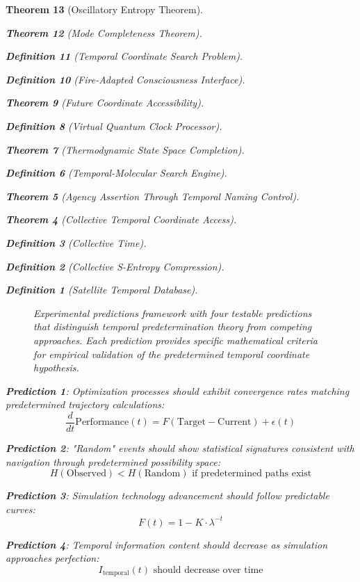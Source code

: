 \documentclass[12pt,a4paper]{article}
\newtheorem{theorem}{Theorem}[section]
\newtheorem{definition}[theorem]{Definition}
\begin{document}
\begin{theorem}[Oscillatory Entropy Theorem]
\begin{theorem}[Mode Completeness Theorem]
\begin{enumerate}
\begin{definition}[Temporal Coordinate Search Problem]
\begin{algorithm}
\begin{definition}[Fire-Adapted Consciousness Interface]
\begin{theorem}[Future Coordinate Accessibility]
\begin{definition}[Virtual Quantum Clock Processor]
\begin{itemize}
\begin{itemize}
\begin{theorem}[Thermodynamic State Space Completion]
\begin{definition}[Temporal-Molecular Search Engine]
\begin{theorem}[Agency Assertion Through Temporal Naming Control]
\begin{remark}
\begin{theorem}[Collective Temporal Coordinate Access]
\begin{definition}[Collective Time]
\begin{definition}[Collective S-Entropy Compression]
\begin{definition}[Satellite Temporal Database]
\begin{algorithm}
\begin{table}[h]
{{\begin{figure}[h]
\caption{Experimental predictions framework with four testable predictions that distinguish temporal predetermination theory from competing approaches. Each prediction provides specific mathematical criteria for empirical validation of the predetermined temporal coordinate hypothesis.}
\label{fig:experimental_predictions}
\end{figure}

\textbf{Prediction 1}: Optimization processes should exhibit convergence rates matching predetermined trajectory calculations:
$$\frac{d}{dt}\text{Performance}(t) = F(\text{Target} - \text{Current}) + \epsilon(t)$$

\textbf{Prediction 2}: "Random" events should show statistical signatures consistent with navigation through predetermined possibility space:
$$H(\text{Observed}) < H(\text{Random}) \text{ if predetermined paths exist}$$

\textbf{Prediction 3}: Simulation technology advancement should follow predictable curves:
$$F(t) = 1 - K \cdot \lambda^{-t}$$

\textbf{Prediction 4}: Temporal information content should decrease as simulation approaches perfection:
$$I_{\text{temporal}}(t) \text{ should decrease over time}$$

}}
\end{table}
\end{algorithm}
\end{definition}
\end{definition}
\end{definition}
\end{theorem}
\end{remark}
\end{theorem}
\end{definition}
\end{theorem}
\end{itemize}
\end{itemize}
\end{definition}
\end{theorem}
\end{definition}
\end{algorithm}
\end{definition}
\end{enumerate}
\end{theorem}
\end{theorem}
\end{document}
